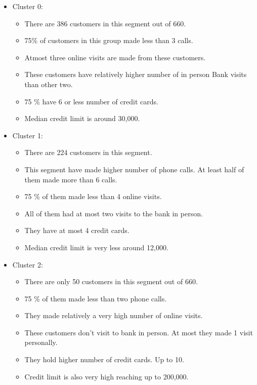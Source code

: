 \documentclass[10pt,a4paper]{style}
\begin{document}
		\begin{itemize}
			\item Cluster 0:
			\begin{itemize}
				\item There are 386 customers in this segment out of 660.
				\item 75\% of customers in this group made less than 3 calls.
				\item Atmost three online visits are made from these customers.
				\item These customers have relatively higher number of in person Bank visits than other two.
				\item 75 \% have 6 or less number of credit cards.
				\item Median credit limit is around 30,000. 
			\end{itemize}
			\item Cluster 1:
			\begin{itemize}
				\item There are 224 customers in this segment.
				\item This segment have made higher number of phone calls. At least half of them made more than 6 calls.
				\item 75 \% of them made less than 4 online visits.
				\item All of them had at most two visits to the bank in person.
				\item They have at most 4 credit cards.
				\item Median credit limit is very less around 12,000.
			\end{itemize}
			\item Cluster 2:
			\begin{itemize}
				\item There are only 50 customers in this segment out of 660.
				\item 75 \% of them made less than two phone calls.
				\item They made relatively a very high number of online visits.
				\item These customers don't visit to bank in person. At most they made 1 visit personally.
				\item They hold higher number of credit cards. Up to 10.
				\item Credit limit is also very high reaching up to 200,000.   
			\end{itemize}
			
		\end{itemize}
	
\end{document}
